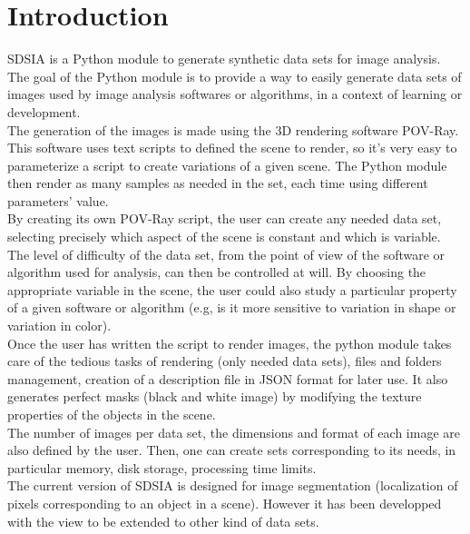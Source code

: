 \section*{Introduction}

SDSIA is a Python module to generate synthetic data sets for image analysis.\\

The goal of the Python module is to provide a way to easily generate data sets of images used by image analysis softwares or algorithms, in a context of learning or development.\\

The generation of the images is made using the 3D rendering software POV-Ray. This software uses text scripts to defined the scene to render, so it's very easy to parameterize a script to create variations of a given scene. The Python module then render as many samples as needed in the set, each time using different parameters' value.\\

By creating its own POV-Ray script, the user can create any needed data set, selecting precisely which aspect of the scene is constant and which is variable. The level of difficulty of the data set, from the point of view of the software or algorithm used for analysis, can then be controlled at will. By choosing the appropriate variable in the scene, the user could also study a particular property of a given software or algorithm (e.g, is it more sensitive to variation in shape or variation in color).\\

Once the user has written the script to render images, the python module takes care of the tedious tasks of rendering (only needed data sets), files and folders management, creation of a description file in JSON format for later use. It also generates perfect masks (black and white image) by modifying the texture properties of the objects in the scene.\\

The number of images per data set, the dimensions and format of each image are also defined by the user. Then, one can create sets corresponding to its needs, in particular memory, disk storage, processing time limits.\\

The current version of SDSIA is designed for image segmentation (localization of pixels corresponding to an object in a scene). However it has been developped with the view to be extended to other kind of data sets.\\

